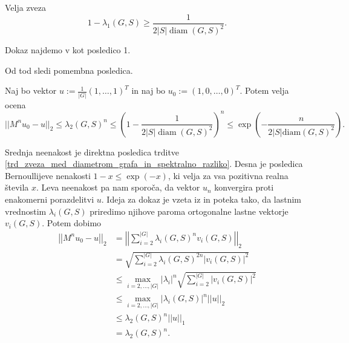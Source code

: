 \begin{trditev}
\label{trd_zveza_med_diametrom_grafa_in_spektralno_razliko}
 Velja zveza \begin{equation*}
 1 - \lambda_1(G, S) \ge \frac{1}{2 \lvert S \rvert \operatorname{diam}(G, S)^2}.
 \end{equation*}  
\end{trditev}
\begin{dokaz}
Dokaz najdemo v \cite{Diaconis_1993} kot posledico 1.  %
\end{dokaz}

Od tod sledi pomembna posledica. \begin{posledica}
\label{psl_posledica_zveze_diameter}
Naj bo vektor $u := \frac{1}{\lvert G \rvert} (1, \ldots, 1)^T$ in naj bo $u_0 := (1, 0, \ldots ,0)^T$. Potem velja ocena \begin{equation*}
\lvert \lvert M^{n} u_0 - u \rvert \rvert_2 \le \lambda_2(G, S)^{n} \le \left( 1 - \frac{1}{2 \lvert S \rvert \operatorname{diam}(G, S)^2 } \right)^{n} \le \exp(- \frac{n}{2 \lvert S \rvert \text{diam}(G, S)^2 }). 
\end{equation*}    
\end{posledica}
\begin{dokaz}
Srednja neenakost je direktna posledica trditve \ref{trd_zveza_med_diametrom_grafa_in_spektralno_razliko}. Desna je posledica Bernoullijeve nenakosti $1 - x \le \exp(-x)$, ki velja za vsa pozitivna realna števila $x$.
Leva neenakost pa nam sporoča, da vektor $u_n$ konvergira proti enakomerni porazdelitvi $u$. Ideja za dokaz je vzeta iz \cite[str.~2]{Trevisan_2008} in poteka tako, da lastnim vrednostim $\lambda_i(G, S)$ priredimo njihove paroma ortogonalne lastne vektorje $v_i(G, S)$.
Potem dobimo \begin{align*}
  \left|\left| M^{n}u_0 -  u  \right|\right|_2 &= \left|\left|  \sum_{i = 2}^{\left| G \right|} \lambda_i(G, S)^n  v_i(G, S)     \right|\right|_2  \\
    &= \sqrt{ \sum_{i = 2}^{\left| G \right|} \lambda_i(G, S)^{2n}  \left| v_i(G, S) \right|^2   }  \\
    &\le \max_{i = 2, \ldots, \left| G \right| } \left| \lambda_i \right|^{n} \sqrt{\sum_{i = 2}^{\left| G \right| } \left| v_i(G, S) \right|^2} \\
    &\le   \max_{i = 2, \ldots, \left| G \right| } \left| \lambda_i(G, S) \right|^{n} \left|\left| u \right|\right|_2 \\
    &\le \lambda_2(G, S)^{n} \lvert\lvert u \rvert\rvert_1 \\
    &= \lambda_2(G, S)^{n}.
\end{align*}
\end{dokaz}

